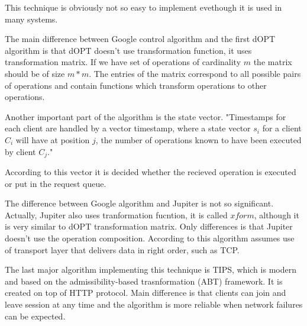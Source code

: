 \documentclass[12pt,oneside]{fithesis2}
\begin{document}
\par This technique is obviously not so easy to implement evethough it is used in many systems.
\par The main difference between Google control algorithm and the first dOPT algorithm is that dOPT doesn't use transformation function, it uses transformation matrix. If we have set of operations of cardinality \(m\) the matrix should be of size \(m * m\). The entries of the matrix correspond to all possible pairs of operations and contain functions which transform operations to other operations. \par Another important part of the algorithm is the state vector. "Time\-stamps for each client are handled by a vector timestamp, where a state vector \(s_i\) for a client \(C_i \) will have at position \(j\), the number of operations known to have been executed by client \(C_j\)." \cite{Leung} \par According to this vector it is decided whether the recieved operation is executed or put in the request queue.
\par The difference between Google algorithm and Jupiter is not so significant. Actually, Jupiter also uses tranformation fucntion, it is called \(xform\), although it is very similar to dOPT transformation matrix. Only differences is that Jupiter doesn't use the operation composition. According to \cite{Jupiter} this algorithm assumes use of transport layer that delivers data in right order, such as TCP.
\par The last major algorithm implementing this technique is TIPS, which is modern and based on the admissibility-based trasnformation (ABT) framework. It is created on top of HTTP protocol. Main difference is that clients can join and leave session at any time and the algorithm is more reliable when network failures can be expected. 
\end{document}
